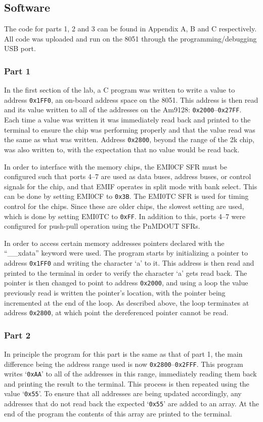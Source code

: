 \documentclass[12pt]{article}
\begin{document}
\subsection{Software}
The code for parts 1, 2 and 3 can be found in Appendix A, B and C respectively. All code was uploaded and run on the 8051 through the programming/debugging USB port. 

\subsubsection{Part 1}
In the first section of the lab, a C program was written to write a value to address \texttt{0x1FF0}, an on-board address space on the 8051. This address is then read and its value written to all of the addresses on the Am9128: \texttt{0x2000}--\texttt{0x27FF}. Each time a value was written it was immediately read back and printed to the terminal to ensure the chip was performing properly and that the value read was the same as what was written. Address \texttt{0x2800}, beyond the range of the 2k chip, was also written to, with the expectation that no value would be read back.

In order to interface with the memory chips, the EMI0CF SFR must be configured such that ports 4--7 are used as data buses, address buses, or control signals for the chip, and that EMIF operates in split mode with bank select. This can be done by setting EMI0CF to \texttt{0x3B}. The EMI0TC SFR is used for timing control for the chips. Since these are older chips, the slowest setting are used, which is done by setting EMI0TC to \texttt{0xFF}. In addition to this, ports 4--7 were configured for push-pull operation using the PnMDOUT SFRs. 

In order to access certain memory addresses pointers declared with the ``\_\_xdata'' keyword were used. The program starts by initializing a pointer to address \texttt{0x1FF0} and writing the character `a' to it. This address is then read and printed to the terminal in order to verify the character `a' gets read back. The pointer is then changed to point to address \texttt{0x2000}, and using a loop the value previously read is written the pointer\textquoteright s location, with the pointer being incremented at the end of the loop. As described above, the loop terminates at address \texttt{0x2800}, at which point the dereferenced pointer cannot be read.

\subsubsection{Part 2}
In principle the program for this part is the same as that of part 1, the main difference being the address range used is now \texttt{0x2800}--\texttt{0x2FFF}. This program writes `\texttt{0xAA}' to all of the addresses in this range, immediately reading them back and printing the result to the terminal. This process is then repeated using the value `\texttt{0x55}'. To ensure that all addresses are being updated accordingly, any addresses that do not read back the expected `\texttt{0x55}' are added to an array. At the end of the program the contents of this array are printed to the terminal.
\end{document}
